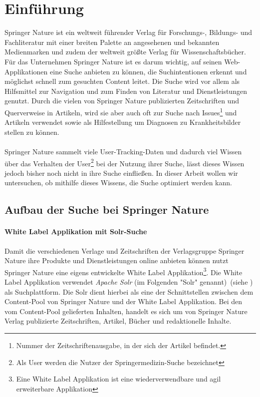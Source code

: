 %
\chapter{Einführung}
\label{sec:Einfuehrung}

Springer Nature ist ein weltweit führender Verlag für Forschungs-, Bildungs- und Fachliteratur mit einer breiten Palette an angesehenen und bekannten Medienmarken und zudem der weltweit größte Verlag für Wissenschaftsbücher. Für das Unternehmen Springer Nature ist es darum wichtig, auf seinen Web-Applikationen eine Suche anbieten zu können, die Suchintentionen erkennt und möglichst schnell zum gesuchten Content leitet. Die Suche wird vor allem als Hilfsmittel zur Navigation und zum Finden von Literatur und Dienstleistungen genutzt. Durch die vielen von Springer Nature publizierten Zeitschriften und Querverweise in Artikeln, wird sie aber auch oft zur Suche nach Issues\footnote{Nummer der Zeitschriftenausgabe, in der sich der Artikel befindet.} und Artikeln verwendet sowie als Hilfestellung um Diagnosen zu Krankheitsbilder stellen zu können.
\\
\\
Springer Nature sammelt viele User-Tracking-Daten und dadurch viel Wissen über das Verhalten der User\footnote{Als User werden die Nutzer der Springermedizin-Suche bezeichnet} bei der Nutzung ihrer Suche, lässt dieses Wissen jedoch bisher noch nicht in ihre Suche einfließen. In dieser Arbeit wollen wir untersuchen, ob mithilfe dieses Wissens, die Suche optimiert werden kann.

\section{Aufbau der Suche bei Springer Nature}
\label{sec:Einfuehrung:AufbauSucheBeiSpringerNature}

\subsubsection{White Label Applikation mit Solr-Suche}
\label{sec:Einfuehrung:AufbauSucheBeiSpringerNature:WhiteLabelApplikationSolr-Suche}

Damit die verschiedenen Verlage und Zeitschriften der Verlagsgruppe Springer Nature ihre Produkte und Dienstleistungen online anbieten können nutzt Springer Nature eine eigens entwickelte White Label Applikation\footnote{Eine White Label Applikation ist eine wiederverwendbare und agil erweiterbare Applikation}. Die White Label Applikation verwendet \textit{Apache Solr} (im Folgenden "Solr" genannt)~(siehe \cite{solr}) als Suchplattform. Die Solr dient hierbei als eine der Schnittstellen zwischen dem Content-Pool von Springer Nature und der White Label Applikation. Bei den vom Content-Pool gelieferten Inhalten, handelt es sich um von Springer Nature Verlag publizierte Zeitschriften, Artikel, Bücher und redaktionelle Inhalte.


